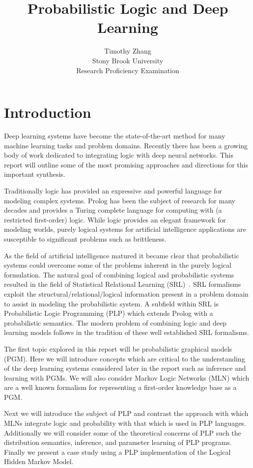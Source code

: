 \documentclass[11pt]{article}
\title{Probabilistic Logic and Deep Learning}
\author{Timothy Zhang\\
	\large Stony Brook University\\
	Research Proficiency Examination}
\begin{document}
\maketitle

\section{Introduction}
Deep learning systems have become the state-of-the-art method for many machine learning tasks and problem domains.  Recently there has been a growing body of work dedicated to integrating logic with deep neural networks.  This report will outline some of the most promising approaches and directions for this important synthesis.

Traditionally logic has provided an expressive and powerful language for modeling complex systems.  Prolog has been the subject of research for many decades and provides a Turing complete language for computing with (a restricted first-order) logic.  While logic provides an elegant framework for modeling worlds, purely logical systems for artificial intelligence applications are susceptible to significant problems such as brittleness.  

As the field of artificial intelligence matured it became clear that probabilistic systems could overcome some of the problems inherent in the purely logical formulation.  The natural goal of combining logical and probabilistic systems resulted in the field of Statistical Relational Learning (SRL)~\cite{Getoor:2007:ISR:1296231}.  SRL formalisms exploit the  structural/relational/logical information present in a problem domain to assist in modeling the probabilistic system.  A subfield within SRL is Probabilistic Logic Programming (PLP) which extends Prolog with a probabilistic semantics.  The modern problem of combining logic and deep learning models follows in the tradition of these well established SRL formalisms.

The first topic explored in this report will be probabilistic graphical models (PGM).  Here we will introduce concepts which are critical to the understanding of the deep learning systems considered later in the report such as inference and learning with PGMs.  We will also consider Markov Logic Networks (MLN) which are a well known formalism for representing a first-order knowledge base as a PGM.  

Next we will introduce the subject of PLP and contrast the approach with which MLNs integrate logic and probability with that which is used in PLP languages.  Additionally we will consider some of the theoretical concerns of PLP such the distribution semantics, inference, and parameter learning of PLP programs.  Finally we present a case study using a PLP implementation of the Logical Hidden Markov Model.
\end{document}
